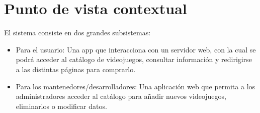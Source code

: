 \documentclass[11pt, spanish]{article}
\begin{document}
\section{Punto de vista contextual}

El sistema consiste en dos grandes subsistemas:

\begin{itemize}
\item Para el usuario: Una app que interacciona con un servidor web, con la cual se podrá acceder al catálogo de videojuegos, consultar información y redirigirse a las distintas páginas para comprarlo.
\item Para los mantenedores/desarrolladores: Una aplicación web que permita a los administradores acceder al catálogo para añadir nuevos videojuegos, eliminarlos o modificar datos.
\end{itemize}

\centering
{}
\end{document}
